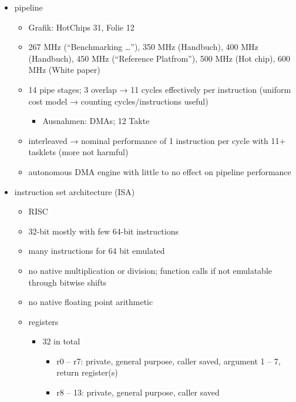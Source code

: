 \begin{itemize}
	\item
	pipeline
	\begin{itemize}
		\item
		Grafik:
		HotChips 31, Folie 12

		\item
		267 MHz (\enquote{Benchmarking …}), 350 MHz (Handbuch), 400 MHz (Handbuch), 450 MHz (\enquote{Reference Platfrom}), 500 MHz (Hot chip), 600 MHz (White paper)

		\item
		14 pipe stages; 3 overlap → 11 cycles effectively per instruction (uniform cost model → counting cycles/instructions useful)
		\begin{itemize}
			\item
			Ausnahmen:
			DMAs;
			12 Takte
		\end{itemize}

		\item
		interleaved → nominal performance of 1 instruction per cycle with 11+ tasklets (more not harmful)

		\item
		autonomous DMA engine with little to no effect on pipeline performance
	\end{itemize}

	\item
	instruction set architecture (ISA)
	\begin{itemize}
		\item
		RISC

		\item
		32-bit mostly with few 64-bit instructions

		\item
		many instructions for 64 bit emulated

		\item
		no native multiplication or division;
		function calls if not emulatable through bitwise shifts

		\item
		no native floating point arithmetic

		\item
		registers
		\begin{itemize}
			\item
			32 in total
			\begin{itemize}
				\item
				r0 -- r7:
				private,
				general purpose,
				caller saved,
				argument 1 -- 7,
				return register(s)

				\item
				r8 -- 13:
				private,
				general purpose,
				caller saved


\end{itemize}
\end{itemize}
\end{itemize}
\end{itemize}
